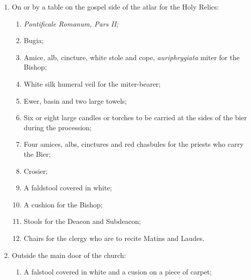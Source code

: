 \documentclass[letterpaper]{report}
\begin{document}
{\begin{enumerate}[label=\Roman*.]
        \item On or by a table on the gospel side of the atlar for the Holy
            Relics:

            \begin{enumerate}[lable=\arabic*.]

                \item \textit{Pontificale Romanum, Pars II;}

                \item Bugia;

                \item Amice, alb, cincture, white stole and cope,
                    \textit{auriphrygiata} miter for the Bishop;

                \item White silk humeral veil for the miter-bearer;

                \item Ewer, basin and two large towels;

                \item Six or eight large candles or torches to be carried at
                    the sides of the bier during the procession;

                \item Four amices, albs, cinctures and red chasbules for the
                    priests who carry the Bier;

                \item Crosier;

                \item A faldstool covered in white;

                \item A cushion for the Bishop;

                \item Stools for the Deacon and Subdeacon;

                \item Chairs for the clergy who are to recite Matins and
                    Laudes.

            \end{enumerate}

        \item Outside the main door of the church:

            \begin{enumerate}[label=\arabic*.]
                
                \item A falstool covered in white and a cusion on a piece of
                    carpet;


\end{enumerate}
\end{enumerate}}
\end{document}
